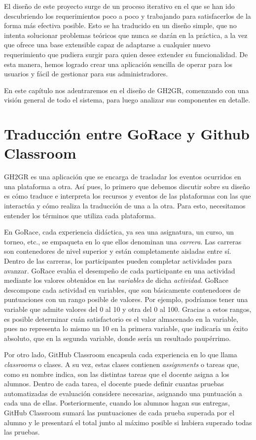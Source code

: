 El diseño de este proyecto surge de un proceso iterativo en el que se han ido descubriendo los requerimientos poco a poco y trabajando para satisfacerlos de la forma más efectiva posible. Esto se ha traducido en un diseño simple, que no intenta solucionar problemas teóricos que nunca se darán en la práctica, a la vez que ofrece una base extensible capaz de adaptarse a cualquier nuevo requerimiento que pudiera surgir para quien desee extender su funcionalidad. De esta manera, hemos logrado crear una aplicación sencilla de operar para los usuarios y fácil de gestionar para sus administradores.

En este capítulo nos adentraremos en el diseño de GH2GR, comenzando con una visión general de todo el sistema, para luego analizar sus componentes en detalle.
\section{Traducción entre GoRace y Github Classroom} \label{title:mapping-gorace-gh}
GH2GR es una aplicación que se encarga de trasladar los eventos ocurridos en una plataforma a otra. Así pues, lo primero que debemos discutir sobre su diseño es cómo traduce e interpreta los recursos y eventos de las plataformas con las que interactúa y cómo realiza la traducción de una a la otra. Para esto, necesitamos entender los términos que utiliza cada plataforma.

En GoRace, cada experiencia didáctica, ya sea una asignatura, un curso, un torneo, etc., se empaqueta en lo que ellos denominan una {\it carrera}. Las carreras son contenedores de nivel superior y están completamente aisladas entre sí. Dentro de las carreras, los participantes pueden completar actividades para avanzar. GoRace evalúa el desempeño de cada participante en una actividad mediante los valores obtenidos en las {\it variables} de dicha {\it actividad}. GoRace descompone cada actividad en variables, que son básicamente contenedores de puntuaciones con un rango posible de valores. Por ejemplo, podríamos tener una variable que admite valores del 0 al 10 y otra del 0 al 100. Gracias a estos rangos, es posible determinar cuán satisfactorio es el valor almacenado en la variable, pues no representa lo mismo un 10 en la primera variable, que indicaría un éxito absoluto, que en la segunda variable, donde sería un resultado paupérrimo.

Por otro lado, GitHub Classroom encapsula cada experiencia en lo que llama \textit{classrooms} o clases. A su vez, estas clases contienen \textit{assignments} o tareas que, como su nombre indica, son las distintas tareas que el docente asigna a los alumnos. Dentro de cada tarea, el docente puede definir cuantas pruebas automatizadas de evaluación considere necesarias, asignando una puntuación a cada una de ellas. Posteriormente, cuando los alumnos hagan sus entregas, GitHub Classroom sumará las puntuaciones de cada prueba superada por el alumno y le presentará el total junto al máximo posible si hubiera superado todas las pruebas.

